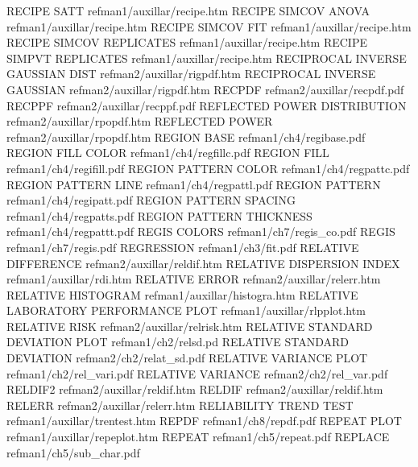 RECIPE SATT                             refman1/auxillar/recipe.htm
RECIPE SIMCOV ANOVA                     refman1/auxillar/recipe.htm
RECIPE SIMCOV FIT                       refman1/auxillar/recipe.htm
RECIPE SIMCOV REPLICATES                refman1/auxillar/recipe.htm
RECIPE SIMPVT REPLICATES                refman1/auxillar/recipe.htm
RECIPROCAL INVERSE GAUSSIAN DIST        refman2/auxillar/rigpdf.htm
RECIPROCAL INVERSE GAUSSIAN             refman2/auxillar/rigpdf.htm
RECPDF                                  refman2/auxillar/recpdf.pdf
RECPPF                                  refman2/auxillar/recppf.pdf
REFLECTED POWER DISTRIBUTION            refman2/auxillar/rpopdf.htm
REFLECTED POWER                         refman2/auxillar/rpopdf.htm
REGION BASE                             refman1/ch4/regibase.pdf
REGION FILL COLOR                       refman1/ch4/regfillc.pdf
REGION FILL                             refman1/ch4/regifill.pdf
REGION PATTERN COLOR                    refman1/ch4/regpattc.pdf
REGION PATTERN LINE                     refman1/ch4/regpattl.pdf
REGION PATTERN                          refman1/ch4/regipatt.pdf
REGION PATTERN SPACING                  refman1/ch4/regpatts.pdf
REGION PATTERN THICKNESS                refman1/ch4/regpattt.pdf
REGIS COLORS                            refman1/ch7/regis_co.pdf
REGIS                                   refman1/ch7/regis.pdf
REGRESSION                              refman1/ch3/fit.pdf
RELATIVE DIFFERENCE                     refman2/auxillar/reldif.htm
RELATIVE DISPERSION INDEX               refman1/auxillar/rdi.htm
RELATIVE ERROR                          refman2/auxillar/relerr.htm
RELATIVE HISTOGRAM                      refman1/auxillar/histogra.htm
RELATIVE LABORATORY PERFORMANCE PLOT    refman1/auxillar/rlpplot.htm
RELATIVE RISK                           refman2/auxillar/relrisk.htm
RELATIVE STANDARD DEVIATION PLOT        refman1/ch2/relsd.pd
RELATIVE STANDARD DEVIATION             refman2/ch2/relat_sd.pdf
RELATIVE VARIANCE PLOT                  refman1/ch2/rel_vari.pdf
RELATIVE VARIANCE                       refman2/ch2/rel_var.pdf
RELDIF2                                 refman2/auxillar/reldif.htm
RELDIF                                  refman2/auxillar/reldif.htm
RELERR                                  refman2/auxillar/relerr.htm
RELIABILITY TREND TEST                  refman1/auxillar/trentest.htm
REPDF                                   refman1/ch8/repdf.pdf
REPEAT PLOT                             refman1/auxillar/repeplot.htm
REPEAT                                  refman1/ch5/repeat.pdf
REPLACE                                 refman1/ch5/sub_char.pdf

